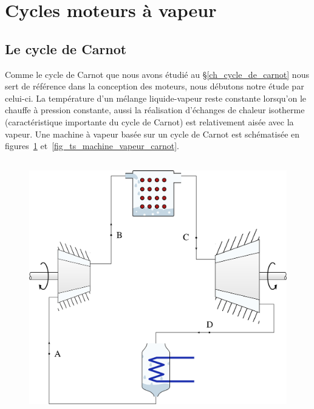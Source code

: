\section{Cycles moteurs à vapeur}
\label{ch_cycles_moteurs_vapeur}

	\subsection{Le cycle de Carnot}

		Comme le cycle de Carnot que nous avons étudié au \S\ref{ch_cycle_de_carnot} nous sert de référence dans la conception des moteurs, nous débutons notre étude par celui-ci. La température d’un mélange liquide-vapeur reste constante lorsqu’on le chauffe à pression constante, aussi la réalisation d’échanges de chaleur isotherme (caractéristique importante du cycle de Carnot) est relativement aisée avec la vapeur. Une machine à vapeur basée sur un cycle de Carnot est schématisée en figures~\ref{fig_machine_vapeur_carnot} et~\ref{fig_ts_machine_vapeur_carnot}.

		\begin{figure}
			\begin{center}
				\includegraphics[height=11cm]{images/circuit_carnot_lv.png}
			\end{center}
			\label{fig_machine_vapeur_carnot}
		\end{figure}

